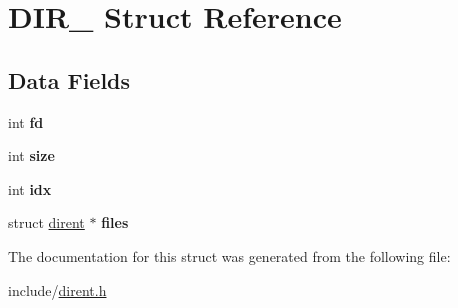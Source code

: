 \hypertarget{structDIR__}{}\section{D\+I\+R\+\_\+ Struct Reference}
\label{structDIR__}
\subsection*{Data Fields}
\begin{DoxyCompactItemize}
\item 
\mbox{\label{structDIR___a6ee1ef4f17d21de531af91188b5eb970}} 
int {\bfseries fd}
\item 
\mbox{\label{structDIR___a5780a417c59461110fdb69f84a86359d}} 
int {\bfseries size}
\item 
\mbox{\label{structDIR___ab0acf7bb3e503264bb5b0e3e672e8c58}} 
int {\bfseries idx}
\item 
\mbox{\label{structDIR___a6bc71e2759731fe33494c9be602a0d7a}} 
struct \mbox{\hyperlink{structdirent}{dirent}} $\ast$ {\bfseries files}
\end{DoxyCompactItemize}


The documentation for this struct was generated from the following file\+:\begin{DoxyCompactItemize}
\item 
include/\mbox{\hyperlink{dirent_8h}{dirent.\+h}}\end{DoxyCompactItemize}

